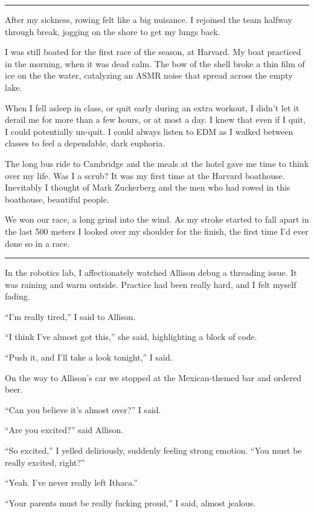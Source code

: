 \plainfancybreak{12pt}{2}{* * *}

After my sickness, rowing felt like a big nuisance.  I rejoined the team halfway
through break, jogging on the shore to get my lungs back.  

I was still boated for the first race of the season, at Harvard.  My boat
practiced in the morning, when it was dead calm.  The bow of the shell broke a
thin film of ice on the the water, catalyzing an ASMR noise that spread across
the empty lake.   

When I fell asleep in class, or quit early during an extra workout, I didn't let
it derail me for more than a few hours, or at most a day.  I knew that even if I
quit, I could potentially un-quit.  I could always listen to EDM as I walked
between classes to feel a dependable, dark euphoria.
 
The long bus ride to Cambridge and the meals at the hotel gave me time to think
over my life.  Was I a scrub?  It was my first time at the Harvard boathouse.
Inevitably I thought of Mark Zuckerberg and the men who had rowed in this
boathouse, beautiful people. 

We won our race, a long grind into the wind. As my stroke started to fall apart
in the last 500 meters I looked over my shoulder for the finish, the first time
I'd ever done so in a race.

\plainfancybreak{12pt}{2}{* * *}

In the robotics lab, I affectionately watched Allison debug a threading issue.
It was raining and warm outside.  Practice had been really hard, and I felt
myself fading.

``I'm really tired,'' I said to Allison.

``I think I've almost got this,'' she said, highlighting a block of code.

``Push it, and I'll take a look tonight,'' I said.

On the way to Allison's car we stopped at the Mexican-themed bar and ordered
beer.

``Can you believe it's almost over?'' I said.

``Are you excited?'' said Allison.

``So excited,'' I yelled deliriously, suddenly feeling strong emotion.  ``You
must be really excited, right?''

``Yeah.  I've never really left Ithaca.''

``Your parents must be really fucking proud,'' I said, almost jealous.

